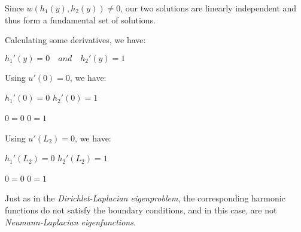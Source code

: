\documentclass[12pt, executivepaper]{article}
\begin{document}
\begin{flushleft}
Since $w(h_{1}(y), h_{2}(y)) \neq 0$, our two solutions are linearly independent and thus form a fundamental set of solutions.

Calculating some derivatives, we have:

\begin{center}

$h_{1}'(y)=0 \quad and \quad h_{2}'(y)=1$

\end{center}

Using $u'(0)=0$, we have: 

\begin{center}

$h_{1}'(0)=0$ \quad \quad \quad $h_{2}'(0)=1$

$0=0$ \quad \quad \quad $0=1$

\end{center}

Using $u'(L_{2})=0$, we have:

\begin{center}

$h_{1}'(L_{2})=0$ \quad \quad \quad $h_{2}'(L_{2})=1$

$0=0$ \quad \quad \quad $0=1$

\end{center}

Just as in the \textit{Dirichlet-Laplacian eigenproblem}, the corresponding harmonic functions do not satisfy the boundary conditions, and in this case, are not \textit{Neumann-Laplacian eigenfunctions}.

\end{flushleft}

\pagebreak

\vspace*{-40mm}
\end{document}
